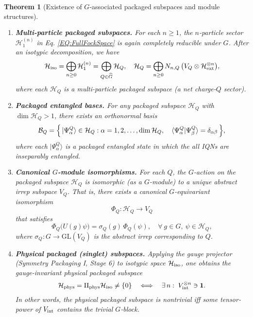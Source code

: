 \documentclass[12pt,a4paper]{article}
\newtheorem{theorem}{Theorem}
\begin{document}
\begin{theorem}[Existence of $G$-associated packaged subspaces and module structures]
\begin{enumerate}
		\item \textbf{Multi-particle packaged subspaces.}		
		For each $n\ge1$, the $n$‐particle sector $\mathcal H_1^{(n)}$ in Eq. \eqref{EQ:FullFockSpace} is again completely reducible under $G$.
		After an isotypic decomposition, we have
		\begin{equation}\label{EQ:MultiParticleDecomposition}
			\mathcal{H}_{\rm iso}
			=
			\bigoplus_{n\ge0}\mathcal H_1^{(n)}
			=
			\bigoplus_{Q\in\widehat G}
			\mathcal H_Q,
			\quad
			\mathcal H_Q
			=
			\bigoplus_{n\ge0}N_{n,Q}\,\bigl(V_Q\otimes\mathcal H_{\rm ext}^{\otimes n}\bigr),
		\end{equation}
		where each $\mathcal{H}_Q$ is a multi-particle packaged subspace (a net charge-$Q$ sector).		
		
		\item \textbf{Packaged entangled bases.}		
		For any packaged subspace $\mathcal{H}_Q$ with $\dim \mathcal{H}_Q>1$, there exists an orthonormal basis
		\begin{equation}\label{EQ:OrthonormalBasisOfPackagedEntangledStates}
			\mathcal{B}_Q = \Bigl\{\, |\Psi^Q_\alpha\rangle \in \mathcal{H}_Q : \alpha = 1, 2, \dots, \dim \mathcal{H}_Q,\quad \langle \Psi^Q_\alpha | \Psi^Q_\beta \rangle = \delta_{\alpha\beta}\, \Bigr\},
		\end{equation}
		where each $ |\Psi^Q_\alpha\rangle $ is a packaged entangled state in which the all IQNs are inseparably entangled.
		
		\item \textbf{Canonical $G$-module isomorphisms.}		
		For each $Q$, the $G$-action on the packaged subspace $\mathcal{H}_Q$ is isomorphic (as a $G$-module) to a unique abstract irrep subspace $V_Q$.
		That is, there exists a canonical $G$-equivariant isomorphism 
		\[
		\Phi_Q: \mathcal{H}_Q \to V_Q
		\]
		that satisfies
		\begin{equation}\label{EQ:IsomorphismMapping}
			\Phi_Q\bigl(U(g)\psi\bigr) = \sigma_Q(g)\,\Phi_Q(\psi),
			\quad
			\forall ~ g \in G, ~ \psi \in \mathcal{H}_Q,
		\end{equation}
		where $\sigma_Q: G \to \mathrm{GL}(V_Q)$ is the abstract irrep corresponding to $Q$.
		
		\item \textbf{Physical packaged (singlet) subspaces.}				
		Applying the gauge projector (Symmetry Packaging I, Stage 6) to isotypic space $\mathcal{H}_{\rm iso}$, one obtains the gauge-invariant physical packaged subspace
		$$
		\mathcal{H}_{\rm phys} 
		= \Pi_{\rm phys} \mathcal{H}_{\rm iso} 
		\neq \{0\}
		\quad
		\Longleftrightarrow
		\quad
		\exists\,n:\;V_{\rm int}^{\otimes n} \ni \mathbf1.
		$$
		In other words, the physical packaged subspace is nontrivial iff some tensor‐power of $V_{\rm int}$ contains the trivial $G$‐block.
	\end{enumerate}
\end{theorem}
\end{document}
